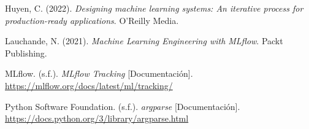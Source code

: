 \documentclass[11pt,letterpaper]{article}
\begin{document}
\noindent\hangindent=1.27cm
Huyen, C. (2022). \textit{Designing machine learning systems: An iterative process for production-ready
applications}. O'Reilly Media.

\noindent\hangindent=1.27cm
Lauchande, N. (2021). \textit{Machine Learning Engineering with MLflow}. Packt Publishing.

\noindent\hangindent=1.27cm
MLflow. (s.f.). \textit{MLflow Tracking} [Documentación]. \url{https://mlflow.org/docs/latest/ml/tracking/}

\noindent\hangindent=1.27cm
Python Software Foundation. (s.f.). \textit{argparse} [Documentación].
\url{https://docs.python.org/3/library/argparse.html}
\end{document}
